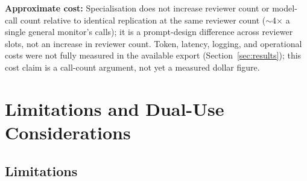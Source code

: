 \documentclass[11pt]{article}
\begin{document}
\textbf{Approximate cost:} Specialisation does not increase reviewer count
or model-call count relative to identical replication at the same reviewer
count ($\sim$4$\times$ a single general monitor's calls); it is a
prompt-design difference across reviewer slots, not an increase in reviewer
count. Token, latency, logging, and operational costs were not fully
measured in the available export (Section~\ref{sec:results}); this cost
claim is a call-count argument, not
yet a measured dollar figure.

\appendix
\section{Limitations and Dual-Use Considerations}
\label{sec:limitations}

\subsection{Limitations}
\end{document}
